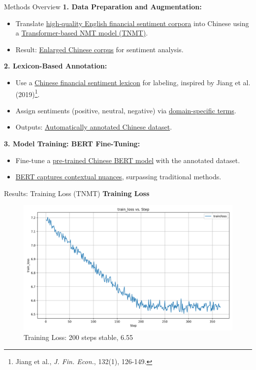 \documentclass[aspectratio=169]{beamer}
\begin{document}
\begin{frame}{Methods Overview}
  \textbf{1. Data Preparation and Augmentation:}
  \begin{itemize}
    \item Translate \underline{high-quality English financial sentiment corpora} into Chinese using a \underline{Transformer-based NMT model (TNMT)}.
    \item Result: \underline{Enlarged Chinese corpus} for sentiment analysis.
  \end{itemize}
  
  \textbf{2. Lexicon-Based Annotation:}
  \begin{itemize}
    \item Use a \underline{Chinese financial sentiment lexicon} for labeling, inspired by Jiang et al. (2019)\footnote{Jiang et al., \textit{J. Fin. Econ.}, 132(1), 126-149.}.
    \item Assign sentiments (positive, neutral, negative) via \underline{domain-specific terms}.
    \item Outputs: \underline{Automatically annotated Chinese dataset}.
  \end{itemize}
  
  \textbf{3. Model Training: BERT Fine-Tuning:}
  \begin{itemize}
    \item Fine-tune a \underline{pre-trained Chinese BERT model} with the annotated dataset.
    \item \underline{BERT captures contextual nuances}, surpassing traditional methods.
  \end{itemize}
  \end{frame}  

\begin{frame}{Results: Training Loss (TNMT)}
  \textbf{Training Loss}
  \begin{figure}
    \centering
    \includegraphics[width=0.6\linewidth]{Transformer_train_loss.png}
    \caption{\small Training Loss: 200 steps stable, 6.55}
  \end{figure}
\end{frame}
\end{document}
